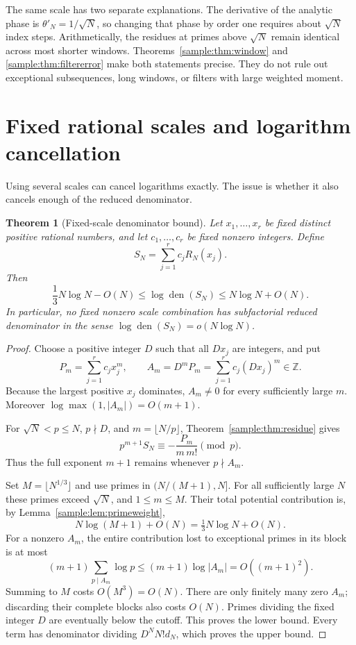 \documentclass[11pt,a4paper]{article}
\newcommand{\Z}{\mathbb Z}
\DeclareMathOperator{\den}{den}
\newtheorem{theorem}{Theorem}[section]
\theoremstyle{definition}
\theoremstyle{remark}
\numberwithin{equation}{section}
\begin{document}
The same scale has two separate explanations. The derivative of the
analytic phase is $\theta'_N=1/\sqrt N$, so changing that phase by order
one requires about $\sqrt N$ index steps. Arithmetically, the residues at
primes above $\sqrt N$ remain identical across most shorter windows.
Theorems~\ref{sample:thm:window} and \ref{sample:thm:filtererror} make both statements
precise. They do not rule out exceptional subsequences, long windows,
or filters with large weighted moment.

\section{Fixed rational scales and logarithm cancellation}
\label{sample:sec:scales}
Using several scales can cancel logarithms exactly. The issue is whether
it also cancels enough of the reduced denominator.

\begin{theorem}[Fixed-scale denominator bound]\label{sample:thm:scaleden}
Let $x_1,\ldots,x_r$ be fixed distinct positive rational numbers, and let
$c_1,\ldots,c_r$ be fixed nonzero integers. Define
\[
S_N=\sum_{j=1}^r c_jR_N(x_j).
\]
Then
\begin{equation}\label{sample:eq:scaleden}
\frac13N\log N-O(N)
\le\log\den(S_N)\le N\log N+O(N).
\end{equation}
In particular, no fixed nonzero scale combination has subfactorial
reduced denominator in the sense $\log\den(S_N)=o(N\log N)$.
\end{theorem}
\begin{proof}
Choose a positive integer $D$ such that all $Dx_j$ are integers, and put
\[
P_m=\sum_{j=1}^r c_jx_j^m,\qquad
A_m=D^mP_m=\sum_{j=1}^r c_j(Dx_j)^m\in\Z.
\]
Because the largest positive $x_j$ dominates, $A_m\ne0$ for every
sufficiently large $m$. Moreover
$\log\max(1,|A_m|)=O(m+1)$.

For $\sqrt N<p\le N$, $p\nmid D$, and $m=\lfloor N/p\rfloor$,
Theorem~\ref{sample:thm:residue} gives
\begin{equation}\label{sample:eq:momentresidue}
p^{m+1}S_N\equiv-\frac{P_m}{m\,m!}\pmod p.
\end{equation}
Thus the full exponent $m+1$ remains whenever $p\nmid A_m$.

Set $M=\lfloor N^{1/3}\rfloor$ and use primes in
$(N/(M+1),N]$. For all sufficiently large $N$ these primes exceed
$\sqrt N$, and $1\le m\le M$.
Their total potential contribution is, by
Lemma~\ref{sample:lem:primeweight},
\[
N\log(M+1)+O(N)=\tfrac13N\log N+O(N).
\]
For a nonzero $A_m$, the entire contribution lost to exceptional primes
in its block is at most
\[
(m+1)\sum_{p\mid A_m}\log p
\le(m+1)\log|A_m|=O((m+1)^2).
\]
Summing to $M$ costs $O(M^3)=O(N)$.
There are only finitely many zero $A_m$; discarding their complete
blocks also costs $O(N)$. Primes dividing the fixed integer $D$ are
eventually below the cutoff. This proves the lower bound. Every term
has denominator dividing $D^NN!d_N$, which proves the upper bound.
\end{proof}
\end{document}
